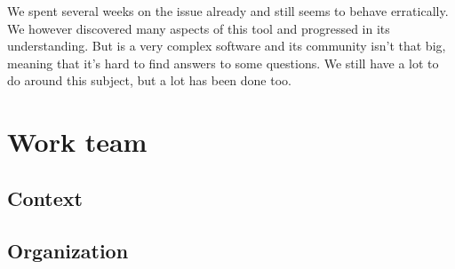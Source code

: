 We spent several weeks on the issue already and  still seems to behave erratically. We however discovered many aspects of this tool and progressed in its understanding. But  is a very complex software and its community isn't that big, meaning that it's hard to find answers to some questions. We still have a lot to do around this subject, but a lot has been done too.

\section{Work team}

\subsection{Context}

\subsection{Organization}

\clearpage
